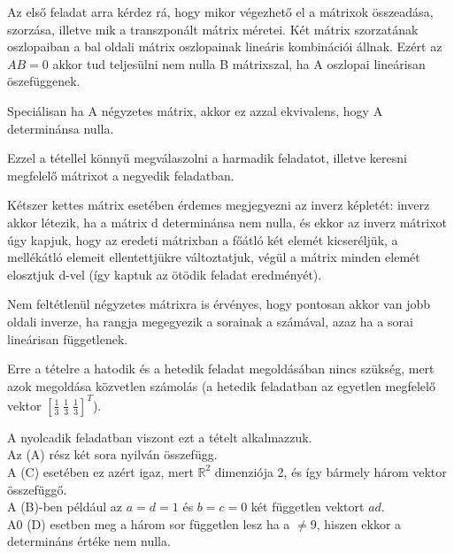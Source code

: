 \begin{frame}
  \begin{tcolorbox}[title={Megoldások {\symking}}]
Az első feladat arra kérdez rá, hogy mikor végezhető el a mátrixok összeadása, szorzása, illetve mik a transzponált mátrix méretei. Két mátrix szorzatának oszlopaiban a bal oldali mátrix oszlopainak lineáris kombinációi állnak. Ezért az $AB = 0$ akkor tud teljesülni nem nulla B mátrixszal, ha A oszlopai lineárisan öszefüggenek.\\
\mmedskip

Speciálisan ha A négyzetes mátrix, akkor ez azzal ekvivalens, hogy A determinánsa nulla.\\
\mmedskip

Ezzel a tétellel könnyű megválaszolni a harmadik feladatot, illetve keresni megfelelő mátrixot a negyedik feladatban. \\
\mmedskip

Kétszer kettes mátrix esetében érdemes megjegyezni az inverz képletét: inverz akkor létezik, ha a mátrix d determinánsa nem nulla, és ekkor az inverz mátrixot úgy kapjuk, hogy az eredeti mátrixban a főátló két elemét kicseréljük, a mellékátló elemeit ellentettjükre változtatjuk, végül a mátrix minden elemét elosztjuk d-vel (így kaptuk az ötödik feladat eredményét).\\
\mmedskip

Nem feltétlenül négyzetes mátrixra is érvényes, hogy pontosan akkor van jobb oldali inverze, ha rangja megegyezik a sorainak a számával, azaz ha a sorai lineárisan függetlenek.\\
\mmedskip

Erre a tételre a hatodik és a hetedik feladat megoldásában nincs szükség, mert azok megoldása közvetlen számolás (a hetedik feladatban az egyetlen megfelelő vektor $[\frac{1}{3} \; \frac{1}{3} \; \frac{1}{3}]^T$).\\
\mmedskip

A nyolcadik feladatban viszont ezt a tételt alkalmazzuk.\\
Az (A) rész két sora nyilván összefügg.\\
A (C) esetében ez azért igaz, mert $\mathbb{R}^2$ dimenziója 2, és így bármely három vektor összefüggő.\\
A (B)-ben például az $a = d = 1$ és $b = c = 0$ két független vektort $ad$.\\
A0 (D) esetben meg a három sor független lesz ha a $\neq 9$, hiszen ekkor a determináns értéke nem nulla.
  \end{tcolorbox}
\end{frame}


